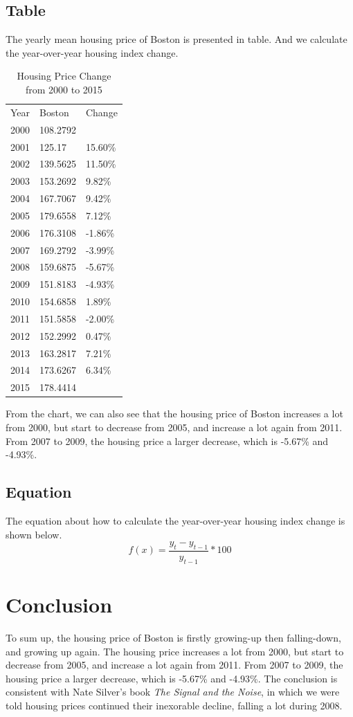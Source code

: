 \documentclass{report}
\begin{document}
\subsection{Table}
The yearly mean housing price of Boston is presented in table. And we calculate the year-over-year housing index change. 
\begin{table}[H]
\centering
\caption{Housing Price Change from 2000 to 2015}
\label{my-label}
\begin{tabular}{lll}
Year & Boston   & Change  \\
2000 & 108.2792 &         \\
2001 & 125.17   & 15.60\% \\
2002 & 139.5625 & 11.50\% \\
2003 & 153.2692 & 9.82\%  \\
2004 & 167.7067 & 9.42\%  \\
2005 & 179.6558 & 7.12\%  \\
2006 & 176.3108 & -1.86\% \\
2007 & 169.2792 & -3.99\% \\
2008 & 159.6875 & -5.67\% \\
2009 & 151.8183 & -4.93\% \\
2010 & 154.6858 & 1.89\%  \\
2011 & 151.5858 & -2.00\% \\
2012 & 152.2992 & 0.47\%  \\
2013 & 163.2817 & 7.21\%  \\
2014 & 173.6267 & 6.34\%  \\
2015 & 178.4414 &        
\end{tabular}
\end{table}

From the chart, we can also see that the housing price of Boston increases a lot from 2000, but start to decrease from 2005, and increase a lot again from 2011. From 2007 to 2009, the housing price a larger decrease, which is -5.67\% and -4.93\%.

\subsection{Equation}
The equation about how to calculate the year-over-year housing index change is shown below.
\[f\left ( x \right )= \frac{y_{t}-y_{t-1}}{y_{t-1}} * 100\]

\section{Conclusion}
To sum up, the housing price of Boston is firstly growing-up then falling-down, and growing up again. The housing price increases a lot from 2000, but start to decrease from 2005, and increase a lot again from 2011. From 2007 to 2009, the housing price a larger decrease, which is -5.67\% and -4.93\%. The conclusion is consistent with Nate Silver's book \textit{The Signal and the Noise}, in which we were told housing prices continued their inexorable decline, falling a lot during 2008.  
\end{document}

